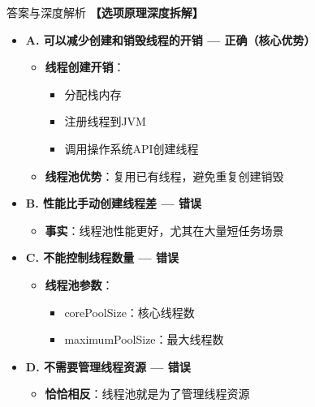 \documentclass[12pt, a4paper]{ctexart}
\begin{document}
\begin{enumerate}[label=\textbf{\arabic*.}]
\begin{bluebox}{答案与深度解析}
		      \textbf{【选项原理深度拆解】}
					  \begin{itemize}[label={}, leftmargin=*, nosep]

		      \item \textbf{A. 可以减少创建和销毁线程的开销 — 正确（核心优势）}
		      \begin{itemize}[label={}, leftmargin=*, nosep]
			      \item \textbf{线程创建开销}：
			            \begin{itemize}[label={}, nosep]
				            \item 分配栈内存
				            \item 注册线程到JVM
				            \item 调用操作系统API创建线程
			            \end{itemize}
			      \item \textbf{线程池优势}：复用已有线程，避免重复创建销毁
		      \end{itemize}

		      \item \textbf{B. 性能比手动创建线程差 — 错误}
		      \begin{itemize}[label={}, leftmargin=*, nosep]
			      \item \textbf{事实}：线程池性能更好，尤其在大量短任务场景
		      \end{itemize}

		      \item \textbf{C. 不能控制线程数量 — 错误}
		      \begin{itemize}[label={}, leftmargin=*, nosep]
			      \item \textbf{线程池参数}：
			            \begin{itemize}[label={}, nosep]
				            \item corePoolSize：核心线程数
				            \item maximumPoolSize：最大线程数
			            \end{itemize}
		      \end{itemize}

		      \item \textbf{D. 不需要管理线程资源 — 错误}
		      \begin{itemize}[label={}, leftmargin=*, nosep]
			      \item \textbf{恰恰相反}：线程池就是为了管理线程资源
		      \end{itemize}


\end{itemize}
\end{bluebox}
\end{enumerate}
\end{document}
